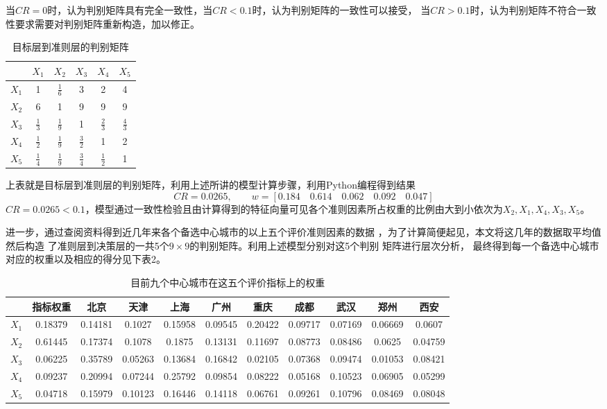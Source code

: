 \documentclass[openany,oneside]{ctexbook}
\begin{document}
\pagestyle{plain}



当$CR=0$时，认为判别矩阵具有完全一致性，当$CR<0.1$时，认为判别矩阵的一致性可以接受，
当$CR>0.1$时，认为判别矩阵不符合一致性要求需要对判别矩阵重新构造，加以修正。

\begin{table}[!htp]
   \centering
   \begin{tabular}{|l|c|c|c|c|c|}
      \hline
      &$X_1$&$X_2$&$X_3$&$X_4$&$X_5$\\ \hline
      $X_1$&1&$\displaystyle\frac{1}{6}$&3&2&4 \\ \hline
      $X_2$&6&1&9&9&9 \\ \hline
      $X_3$&$\displaystyle\frac{1}{3}$&$\displaystyle\frac{1}{9}$&1&$\displaystyle\frac{2}{3}$&$\displaystyle\frac{4}{3}$ \\ \hline
      $X_4$&$\displaystyle\frac{1}{2}$&$\displaystyle\frac{1}{9}$&$\displaystyle\frac{3}{2}$&1&2 \\ \hline
      $X_5$&$\displaystyle\frac{1}{4}$&$\displaystyle\frac{1}{9}$&$\displaystyle\frac{3}{4}$&$\displaystyle\frac{1}{2}$&1 \\ \hline
   \end{tabular}
   \caption{目标层到准则层的判别矩阵}
\end{table}

上表就是目标层到准则层的判别矩阵，利用上述所讲的模型计算步骤，利用Python编程得到结果
\[
   CR=0.0265,\qquad w=[0.184\quad 0.614\quad 0.062\quad  0.092\quad 0.047]
\]
$CR=0.0265<0.1$，模型通过一致性检验且由计算得到的特征向量可见各个准则因素所占权重的比例由大到小依次为$X_2,X_1,X_4,X_3,X_5$。

进一步，通过查阅资料得到近几年来各个备选中心城市的以上五个评价准则因素的数据
，为了计算简便起见，本文将这几年的数据取平均值然后构造
了准则层到决策层的一共5个$9\times 9$的判别矩阵。利用上述模型分别对这5个判别
矩阵进行层次分析，
最终得到每一个备选中心城市对应的权重以及相应的得分见下表2。

\begin{table}[!htp]
   \centering
   \begin{tabular}{|l|c|c|c|c|c|c|c|c|c|c|}
      \hline
      &指标权重&北京&天津&上海&广州&重庆&成都&武汉&郑州&西安 \\ \hline
      $X_1$&0.18379&0.14181&0.1027&0.15958&0.09545&0.20422&0.09717&0.07169&0.06669&0.0607 \\ \hline
      $X_2$&0.61445&0.17374&0.1078&0.1875&0.13131&0.11697&0.08773&0.08486&0.0625&0.04759 \\ \hline
      $X_3$&0.06225&0.35789&0.05263&0.13684&0.16842&0.02105&0.07368&0.09474&0.01053&0.08421 \\ \hline
      $X_4$&0.09237&0.20994&0.07244&0.25792&0.09854&0.08222&0.05168&0.10523&0.06905&0.05299 \\ \hline
      $X_5$&0.04718&0.15979&0.10123&0.16446&0.14118&0.06761&0.09261&0.10796&0.08469&0.08048 \\ \hline
   \end{tabular}
   \caption{目前九个中心城市在这五个评价指标上的权重}
\end{table}
\end{document}
